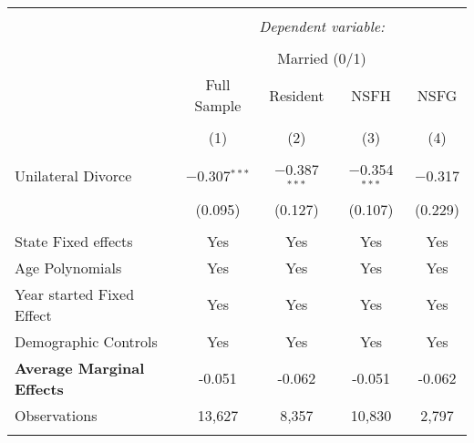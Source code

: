 
\begingroup 
\footnotesize 
\begin{tabular}{@{\extracolsep{5pt}}lcccc} 
\\[-1.8ex]\hline 
\hline \\[-1.8ex] 
 & \multicolumn{4}{c}{\textit{Dependent variable:}} \\ 
\cline{2-5} 
\\[-1.8ex] & \multicolumn{4}{c}{Married (0/1)} \\ 
 & Full Sample & Resident & NSFH & NSFG \\ 
\\[-1.8ex] & (1) & (2) & (3) & (4)\\ 
\hline \\[-1.8ex] 
 Unilateral Divorce & $-$0.307$^{***}$ & $-$0.387$^{***}$ & $-$0.354$^{***}$ & $-$0.317 \\ 
  & (0.095) & (0.127) & (0.107) & (0.229) \\ 
 \hline \\[-1.8ex] 
State Fixed effects & Yes & Yes & Yes & Yes \\ 
Age Polynomials & Yes & Yes & Yes & Yes \\ 
Year started Fixed Effect & Yes & Yes & Yes & Yes \\ 
Demographic Controls & Yes & Yes & Yes & Yes \\ 
\textbf{Average Marginal Effects} & -0.051 & -0.062 & -0.051 & -0.062 \\ 
Observations & 13,627 & 8,357 & 10,830 & 2,797 \\ 
\hline 
\hline \\[-1.8ex] 
\end{tabular} 
\endgroup 
